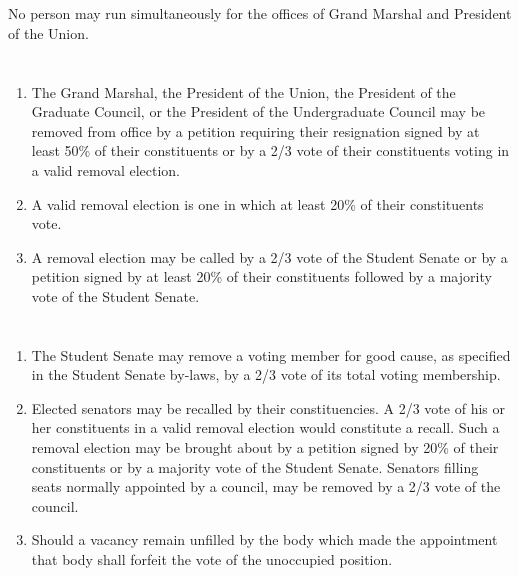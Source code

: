 \documentclass{uniondoc}
\begin{document}
\section{}

No person may run simultaneously for the offices of Grand Marshal and President of the Union.


\section{}

\begin{enumerate}
\item The Grand Marshal, the President of the Union, the President of the Graduate Council, or the President of the Undergraduate Council may be removed from office by a petition requiring their resignation signed by at least 50\% of their constituents or by a 2/3 vote of their constituents voting in a valid removal election.
\item A valid removal election is one in which at least 20\% of their constituents vote.
\item A removal election may be called by a 2/3 vote of the Student Senate or by a petition signed by at least 20\% of their constituents followed by a majority vote of the Student Senate.
\end{enumerate}

\section{}

\begin{enumerate}
\item The Student Senate may remove a voting member for good cause, as specified in the Student Senate by-laws, by a 2/3 vote of its total voting membership.
\item Elected senators may be recalled by their constituencies. A 2/3 vote of his or her constituents in a valid removal election would constitute a recall. Such a removal election may be brought about by a petition signed by 20\% of their constituents or by a majority vote of the Student Senate. Senators filling seats normally appointed by a council, may be removed by a 2/3 vote of the council.
\item Should a vacancy remain unfilled by the body which made the appointment that body shall forfeit the vote of the unoccupied position.
\end{enumerate}
\end{document}
